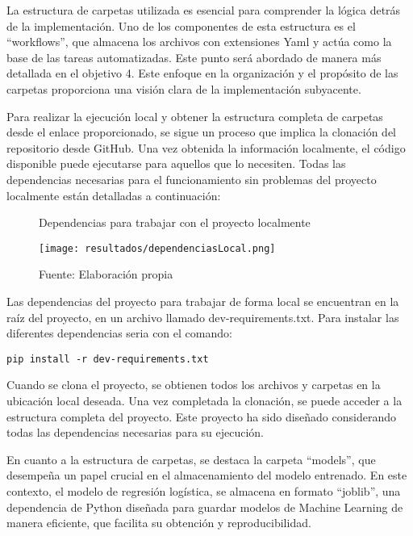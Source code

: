 \newpage

La estructura de carpetas utilizada es esencial para comprender la lógica detrás de la implementación. Uno de los componentes de esta estructura es el ``workflows'', que almacena los archivos con extensiones Yaml y actúa como la base de las tareas automatizadas. Este punto será abordado de manera más detallada en el objetivo 4. Este enfoque en la organización y el propósito de las carpetas proporciona una visión clara de la implementación subyacente.

Para realizar la ejecución local y obtener la estructura completa de carpetas desde el enlace proporcionado, se sigue un proceso que implica la clonación del repositorio desde GitHub. Una vez obtenida la información localmente, el código disponible puede ejecutarse para aquellos que lo necesiten. Todas las dependencias necesarias para el funcionamiento sin problemas del proyecto localmente están detalladas a continuación:


\begin{figure}[h]
\centering
\caption{Dependencias para trabajar con el proyecto localmente}
\texttt{[image: resultados/dependenciasLocal.png]}
\caption*{\footnotesize Fuente: Elaboración propia}
\label{fig:figuraDependenciasLocal}
\end{figure}

\newpage

Las dependencias del proyecto para trabajar de forma local se encuentran en la raíz del proyecto, en un archivo llamado dev-requirements.txt. Para instalar las diferentes dependencias seria con el comando: 
\begin{verbatim}
pip install -r dev-requirements.txt
\end{verbatim}

Cuando se clona el proyecto, se obtienen todos los archivos y carpetas en la ubicación local deseada. Una vez completada la clonación, se puede acceder a la estructura completa del proyecto. Este proyecto ha sido diseñado considerando todas las dependencias necesarias para su ejecución. \newline

En cuanto a la estructura de carpetas, se destaca la carpeta ``models'', que desempeña un papel crucial en el almacenamiento del modelo entrenado. En este contexto, el modelo de regresión logística, se almacena en formato “joblib”, una dependencia de Python diseñada para guardar modelos de Machine Learning de manera eficiente, que facilita su obtención y reproducibilidad. \newline

